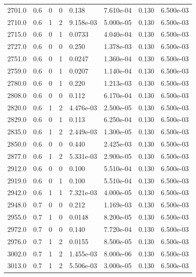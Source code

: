 \documentclass[preview]{standalone}
\begin{document}
{{{{{{\begin{tabular}{L{1.2cm}C{1.2cm} C{0.3cm}C{0.5cm} C{1.4cm}C{1.4cm} C{1.4cm}C{1.4cm}}
  2701.0  &   0.6  & 0     &  0 &  0.138  & 7.610e-04  & 0.130 &  6.500e-03   \\ 
  2710.0  &   0.6  & 1     &  2 &  9.158e-03  & 5.000e-05  & 0.130 &  6.500e-03   \\ 
  2715.0  &   0.6  & 0     &  1 &  0.0733  & 4.040e-04  & 0.130 &  6.500e-03   \\ 
  2727.0  &   0.6  & 0     &  0 &  0.250  & 1.378e-03  & 0.130 &  6.500e-03   \\ 
  2751.0  &   0.6  & 0     &  1 &  0.0247  & 1.360e-04  & 0.130 &  6.500e-03   \\ 
  2759.0  &   0.6  & 0     &  1 &  0.0207  & 1.140e-04  & 0.130 &  6.500e-03   \\ 
  2780.0  &   0.6  & 0     &  1 &  0.220  & 1.213e-03  & 0.130 &  6.500e-03   \\ 
  2808.0  &   0.6  & 0     &  0 &  0.112  & 6.170e-04  & 0.130 &  6.500e-03   \\ 
  2820.0  &   0.6  & 1     &  2 &  4.476e-03  & 2.500e-05  & 0.130 &  6.500e-03   \\ 
  2829.0  &   0.6  & 0     &  1 &  0.113  & 6.250e-04  & 0.130 &  6.500e-03   \\ 
  2835.0  &   0.6  & 1     &  2 &  2.449e-03  & 1.300e-05  & 0.130 &  6.500e-03   \\ 
  2850.0  &   0.6  & 0     &  0 &  0.440  & 2.425e-03  & 0.130 &  6.500e-03   \\ 
  2877.0  &   0.6  & 1     &  2 &  5.331e-03  & 2.900e-05  & 0.130 &  6.500e-03   \\ 
  2912.0  &   0.6  & 0     &  0 &  0.100  & 5.510e-04  & 0.130 &  6.500e-03   \\ 
  2919.0  &   0.6  & 0     &  1 &  0.100  & 5.510e-04  & 0.130 &  6.500e-03   \\ 
  2942.0  &   0.6  & 1     &  1 &  7.321e-03  & 4.000e-05  & 0.130 &  6.500e-03   \\ 
  2948.0  &   0.7  & 0     &  0 &  0.212  & 1.169e-03  & 0.130 &  6.500e-03   \\ 
  2955.0  &   0.7  & 1     &  0 &  0.0148  & 8.200e-05  & 0.130 &  6.500e-03   \\ 
  2972.0  &   0.7  & 0     &  0 &  0.140  & 7.720e-04  & 0.130 &  6.500e-03   \\ 
  2976.0  &   0.7  & 1     &  2 &  0.0155  & 8.500e-05  & 0.130 &  6.500e-03   \\ 
  3002.0  &   0.7  & 1     &  2 &  1.455e-03  & 8.000e-06  & 0.130 &  6.500e-03   \\ 
  3013.0  &   0.7  & 1     &  2 &  5.506e-03  & 3.000e-05  & 0.130 &  6.500e-03   \\ 

\end{tabular}}}}}}}
\end{document}
